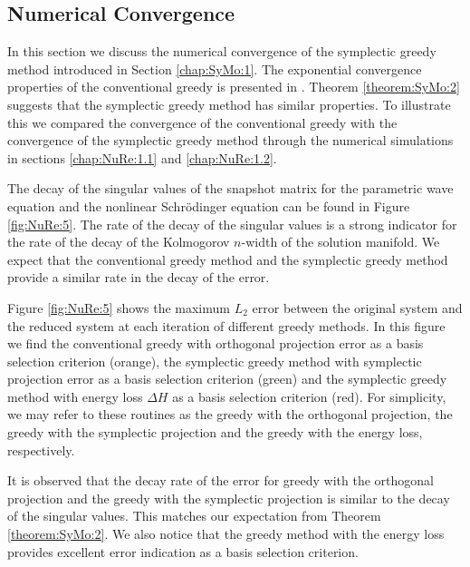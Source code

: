 \subsection{Numerical Convergence} {\edit In this section we discuss the numerical convergence of the symplectic greedy method introduced in Section \ref{chap:SyMo:1}. The exponential convergence properties of the conventional greedy \cite{Quarteroni:2016wi} is presented in \cite{Buffa:2012iz,Binev:2011fj}. Theorem \ref{theorem:SyMo:2} suggests that the symplectic greedy method has similar properties. To illustrate this we compared the convergence of the conventional greedy with the convergence of the symplectic greedy method through the numerical simulations in sections \ref{chap:NuRe:1.1} and \ref{chap:NuRe:1.2}. 

The decay of the singular values of the snapshot matrix for the parametric wave equation and the nonlinear Schr\"odinger equation can be found in Figure \ref{fig:NuRe:5}. The rate of the decay of the singular values is a strong indicator for the rate of the decay of the Kolmogorov $n$-width of the solution manifold. We expect that the conventional greedy method and the symplectic greedy method provide a similar rate in the decay of the error.
	
Figure \ref{fig:NuRe:5} shows the maximum $L_2$ error between the original system and the reduced system at each iteration of different greedy methods. In this figure we find the conventional greedy with orthogonal projection error as a basis selection criterion (orange), the symplectic greedy method with symplectic projection error as a basis selection criterion (green) and the symplectic greedy method with energy loss $\Delta H$ as a basis selection criterion (red). For simplicity, we may refer to these routines as the greedy with the orthogonal projection, the greedy with the symplectic projection and the greedy with the energy loss, respectively.

It is observed that the decay rate of the error for greedy with the orthogonal projection and the greedy with the symplectic projection is similar to the decay of the singular values. This matches our expectation from Theorem \ref{theorem:SyMo:2}. We also notice that the greedy method with the energy loss provides excellent error indication as a basis selection criterion.
}


